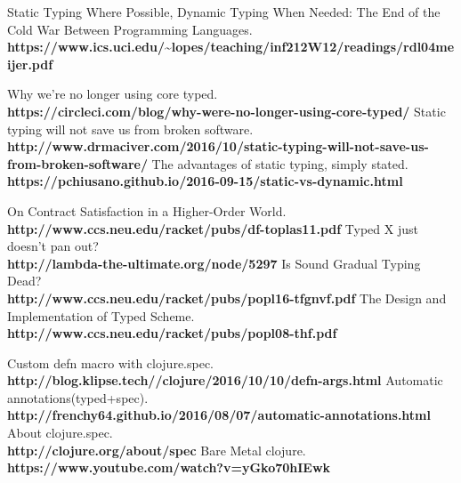 \documentclass[12pt,a4paper]{report}
\begin{document}
\begin{thebibliography}{9}
  Static Typing Where Possible, Dynamic Typing When Needed: The End of the Cold
  War Between Programming Languages.\\
  \textbf{https://www.ics.uci.edu/\textasciitilde{}lopes/teaching/inf212W12/readings/rdl04meijer.pdf}

  Why we're no longer using core typed.\\
  \textbf{https://circleci.com/blog/why-were-no-longer-using-core-typed/}
  Static typing will not save us from broken software.\\
  \textbf{http://www.drmaciver.com/2016/10/static-typing-will-not-save-us-from-broken-software/}
  The advantages of static typing, simply stated.\\
  \textbf{https://pchiusano.github.io/2016-09-15/static-vs-dynamic.html}



  On Contract Satisfaction in a Higher-Order World.\\
  \textbf{http://www.ccs.neu.edu/racket/pubs/df-toplas11.pdf}
  Typed X just doesn't pan out?\\
  \textbf{http://lambda-the-ultimate.org/node/5297}
  Is Sound Gradual Typing Dead?\\
  \textbf{http://www.ccs.neu.edu/racket/pubs/popl16-tfgnvf.pdf}
  The Design and Implementation of Typed Scheme.\\
  \textbf{http://www.ccs.neu.edu/racket/pubs/popl08-thf.pdf}



  Custom defn macro with clojure.spec.\\
  \textbf{http://blog.klipse.tech//clojure/2016/10/10/defn-args.html}
  Automatic annotations(typed+spec).\\
  \textbf{http://frenchy64.github.io/2016/08/07/automatic-annotations.html}
  About clojure.spec. \\
  \textbf{http://clojure.org/about/spec}
  Bare Metal clojure.\\
  \textbf{https://www.youtube.com/watch?v=yGko70hIEwk}

\end{thebibliography}
\end{document}

